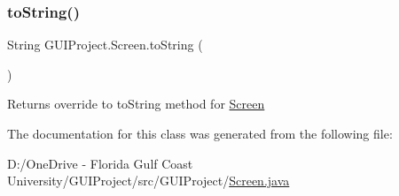 \subsubsection{\texorpdfstring{toString()}{toString()}}
{\footnotesize\ttfamily String G\+U\+I\+Project.\+Screen.\+to\+String (\begin{DoxyParamCaption}{ }\end{DoxyParamCaption})}

\begin{DoxyReturn}{Returns}
override to to\+String method for \mbox{\hyperlink{class_g_u_i_project_1_1_screen}{Screen}} 
\end{DoxyReturn}


The documentation for this class was generated from the following file\+:\begin{DoxyCompactItemize}
\item 
D\+:/\+One\+Drive -\/ Florida Gulf Coast University/\+G\+U\+I\+Project/src/\+G\+U\+I\+Project/\mbox{\hyperlink{_screen_8java}{Screen.\+java}}\end{DoxyCompactItemize}
